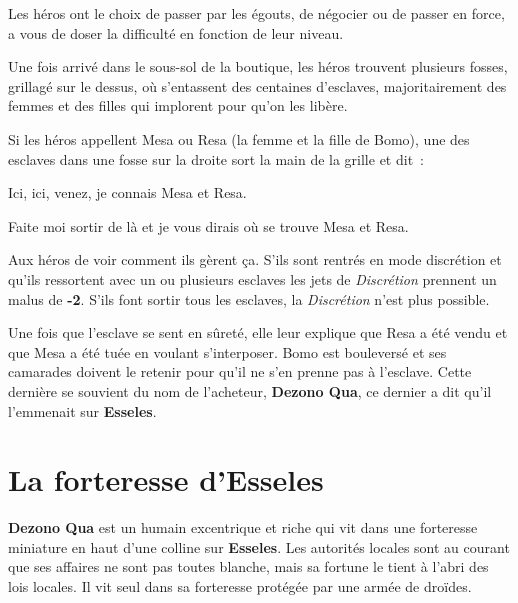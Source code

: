 \documentclass{jdrp}
\begin{document}
	Les héros ont le choix de passer par les égouts, de négocier ou de passer en force, a vous de doser la difficulté en fonction de leur niveau.

	Une fois arrivé dans le sous-sol de la boutique, les héros trouvent plusieurs fosses, grillagé sur le dessus, où s’entassent des centaines d’esclaves, majoritairement des femmes et des filles qui implorent pour qu’on les libère.

	Si les héros appellent Mesa ou Resa (la femme et la fille de Bomo), une des esclaves dans une fosse sur la droite sort la main de la grille et dit~:

	\begin{quotebox}
    	Ici, ici, venez, je connais Mesa et Resa.

    	Faite moi sortir de là et je vous dirais où se trouve Mesa et Resa.
	\end{quotebox}
	Aux héros de voir comment ils gèrent ça. S’ils sont rentrés en mode discrétion et qu’ils ressortent avec un ou plusieurs esclaves les jets de \textit{Discrétion} prennent un malus de \textbf{-2}. S’ils font sortir tous les esclaves, la \textit{Discrétion} n’est plus possible.

	Une fois que l’esclave se sent en sûreté, elle leur explique que Resa a été vendu et que Mesa a été tuée en voulant s’interposer. Bomo est bouleversé et ses camarades doivent le retenir pour qu’il ne s’en prenne pas à l’esclave. Cette dernière se souvient du nom de l’acheteur, \textbf{Dezono Qua}, ce dernier a dit qu’il l’emmenait sur \textbf{Esseles}.

	\section{La forteresse d’Esseles}
	\textbf{Dezono Qua} est un humain excentrique et riche qui vit dans une forteresse miniature en haut d’une colline sur \textbf{Esseles}. Les autorités locales sont au courant que ses affaires ne sont pas toutes blanche, mais sa fortune le tient à l’abri des lois locales. Il vit seul dans sa forteresse protégée par une armée de droïdes.\\ 
\end{document}
